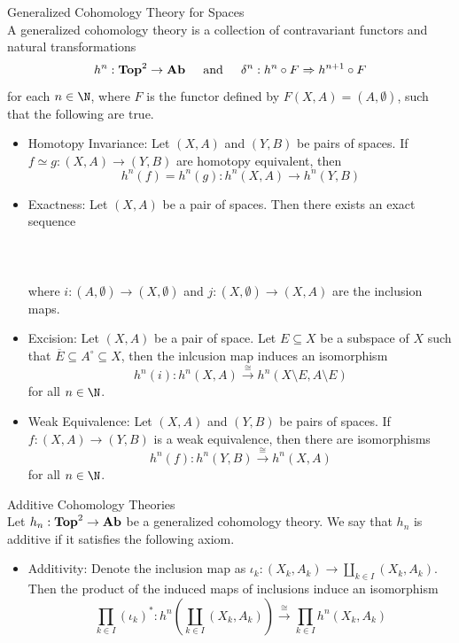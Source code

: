 \documentclass[a4paper]{article}
\begin{document}
\begin{defn}{Generalized Cohomology Theory for Spaces}{}\\
A generalized cohomology theory is a collection of contravariant functors and natural transformations $$h^n:\bold{Top}^2\to\bold{Ab}\;\;\;\;\text{ and }\;\;\;\;\delta^n:h^n\circ F\Rightarrow h^{n+1}\circ F$$ for each $n\in\N$, where $F$ is the functor defined by $F(X,A)=(A,\emptyset)$, such that the following are true. 
\begin{itemize}
\item Homotopy Invariance: Let $(X,A)$ and $(Y,B)$ be pairs of spaces. If $f\simeq g:(X,A)\to(Y,B)$ are homotopy equivalent, then $$h^n(f)=h^n(g):h^n(X,A)\to h^n(Y,B)$$
\item Exactness: Let $(X,A)$ be a pair of spaces. Then there exists an exact sequence\\~\\
\\~\\
where $i:(A,\emptyset)\to(X,\emptyset)$ and $j:(X,\emptyset)\to(X,A)$ are the inclusion maps. 
\item Excision: Let $(X,A)$ be a pair of space. Let $E\subseteq X$ be a subspace of $X$ such that $\overline{E}\subseteq A^\circ\subseteq X$, then the inlcusion map induces an isomorphism $$h^n(i):h^n(X,A)\overset{\cong}{\longrightarrow}h^n(X\setminus E,A\setminus E)$$ for all $n\in\N$. 
\item Weak Equivalence: Let $(X,A)$ and $(Y,B)$ be pairs of spaces. If $f:(X,A)\to(Y,B)$ is a weak equivalence, then there are isomorphisms $$h^n(f):h^n(Y,B)\overset{\cong}{\longrightarrow}h^n(X,A)$$ for all $n\in\N$. 
\end{itemize}
\end{defn}

\begin{defn}{Additive Cohomology Theories}{}\\
Let $h_n:\bold{Top}^2\to\bold{Ab}$ be a generalized cohomology theory. We say that $h_n$ is additive if it satisfies the following axiom. 
\begin{itemize}
\item Additivity: Denote the inclusion map as $\iota_k:(X_k,A_k)\to\coprod_{k\in I}(X_k,A_k)$. Then the product of the induced maps of inclusions induce an isomorphism $$\prod_{k\in I}(\iota_k)^\ast:h^n\left(\coprod_{k\in I}(X_k,A_k)\right)\overset{\cong}{\longrightarrow}\prod_{k\in I}h^n(X_k,A_k)$$
\end{itemize}
\end{defn}
\end{document}
